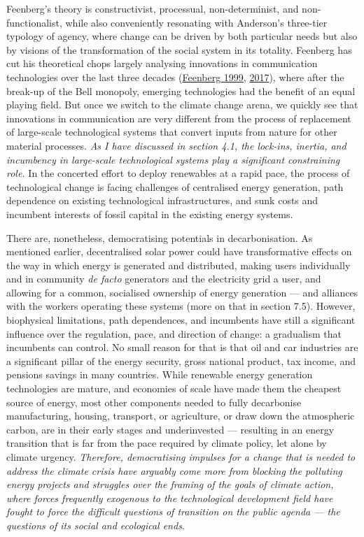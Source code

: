 \documentclass[a4paper, nobind]{templates/ociamthesis}
\begin{document}
Feenberg's theory is constructivist, processual, non-determinist, and non-functionalist, while also conveniently resonating with Anderson's three-tier typology of agency, where change can be driven by both particular needs but also by visions of the transformation of the social system in its totality. Feenberg has cut his theoretical chops largely analysing innovations in communication technologies over the last three decades (\protect\hyperlink{ref-feenberg_questioning_1999}{Feenberg 1999}, \protect\hyperlink{ref-feenberg_technosystem_2017}{2017}), where after the break-up of the Bell monopoly, emerging technologies had the benefit of an equal playing field. But once we switch to the climate change arena, we quickly see that innovations in communication are very different from the process of replacement of large-scale technological systems that convert inputs from nature for other material processes. \emph{As I have discussed in section 4.1, the lock-ins, inertia, and incumbency in large-scale technological systems play a significant constraining role.} In the concerted effort to deploy renewables at a rapid pace, the process of technological change is facing challenges of centralised energy generation, path dependence on existing technological infrastructures, and sunk costs and incumbent interests of fossil capital in the existing energy systems.

There are, nonetheless, democratising potentials in decarbonisation. As mentioned earlier, decentralised solar power could have transformative effects on the way in which energy is generated and distributed, making users individually and in community \emph{de facto} generators and the electricity grid a user, and allowing for a common, socialised ownership of energy generation --- and alliances with the workers operating these systems (more on that in section 7.5). However, biophysical limitations, path dependences, and incumbents have still a significant influence over the regulation, pace, and direction of change: a gradualism that incumbents can control. No small reason for that is that oil and car industries are a significant pillar of the energy security, gross national product, tax income, and pensions savings in many countries. While renewable energy generation technologies are mature, and economies of scale have made them the cheapest source of energy, most other components needed to fully decarbonise manufacturing, housing, transport, or agriculture, or draw down the atmospheric carbon, are in their early stages and underinvested --- resulting in an energy transition that is far from the pace required by climate policy, let alone by climate urgency. \emph{Therefore, democratising impulses for a change that is needed to address the climate crisis have arguably come more from blocking the polluting energy projects and struggles over the framing of the goals of climate action, where forces frequently exogenous to the technological development field have fought to force the difficult questions of transition on the public agenda --- the questions of its social and ecological ends}.
\end{document}
